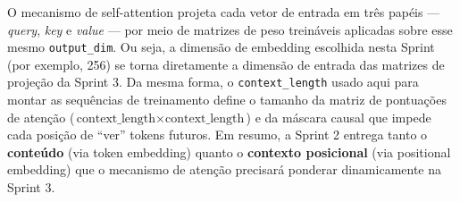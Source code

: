 \documentclass[11pt,a4paper]{article}
\begin{document}
O mecanismo de self-attention projeta cada vetor de entrada em três papéis
--- \emph{query}, \emph{key} e \emph{value} --- por meio de matrizes de peso treináveis
aplicadas sobre esse mesmo \texttt{output\_dim}. Ou seja, a dimensão de embedding
escolhida nesta Sprint (por exemplo, 256) se torna diretamente a dimensão de entrada das
matrizes de projeção da Sprint 3. Da mesma forma, o \texttt{context\_length} usado aqui
para montar as sequências de treinamento define o tamanho da matriz de pontuações de
atenção ($\text{context\_length} \times \text{context\_length}$) e da máscara causal que
impede cada posição de ``ver'' tokens futuros. Em resumo, a Sprint 2 entrega tanto o
\textbf{conteúdo} (via token embedding) quanto o \textbf{contexto posicional} (via
positional embedding) que o mecanismo de atenção precisará ponderar dinamicamente na
Sprint 3.
\end{document}

